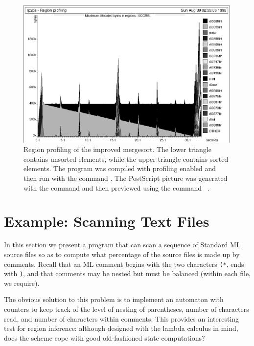 \documentclass[12pt]{book}
\begin{document}
\begin{figure}
\begin{center}
\includegraphics{msortreset2.ps}
\end{center}
%
%
%
%
\caption{Region profiling of the improved mergesort. 
  The lower triangle contains unsorted elements, while the upper
  triangle contains sorted elements.  The program was compiled with
  profiling enabled and then run with the command . 
  The PostScript picture  was generated
  with the command 
  and then previewed using the command ~.}
\label{msortreset.fig}
\end{figure}

\section{Example: Scanning Text Files}
\label{scan.sec}
In this section we present a program that can 
scan a sequence of Standard ML source
files so as to compute what percentage of the source files is made
up by comments. Recall that an ML comment begins with the two
characters {\tt (*}, ends with {\tt *)}, and that comments may be
nested but must be balanced (within each file, we require).

The obvious solution to this problem is to implement an
automaton with counters to keep track of the level
of nesting of parentheses, number of characters read, and
number of characters within comments. This provides an interesting test
for region inference: although designed with the lambda calculus
in mind, does the scheme cope with good old-fashioned state
computations? 
\end{document}
